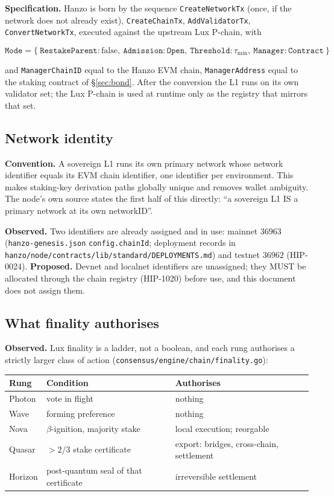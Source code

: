 \documentclass[11pt,a4paper]{article}
\theoremstyle{definition}
\theoremstyle{remark}
\newcommand{\code}[1]{\texttt{#1}}
\begin{document}
\textbf{Specification.} Hanzo is born by the sequence \code{CreateNetworkTx}
(once, if the network does not already exist), \code{CreateChainTx},
\code{AddValidatorTx}, \code{ConvertNetworkTx}, executed against the upstream
Lux P-chain, with

\[
\texttt{Mode} = \{\ \texttt{RestakeParent}: \text{false},\
\texttt{Admission}: \texttt{Open},\
\texttt{Threshold}: \tau_{\min},\
\texttt{Manager}: \texttt{Contract}\ \}
\]

and \code{ManagerChainID} equal to the Hanzo EVM chain, \code{ManagerAddress}
equal to the staking contract of \S\ref{sec:bond}. After the conversion the L1
runs on its own validator set; the Lux P-chain is used at runtime only as the
registry that mirrors that set.

\subsection{Network identity}

\textbf{Convention.} A sovereign L1 runs its own primary network whose network
identifier equals its EVM chain identifier, one identifier per environment. This
makes staking-key derivation paths globally unique and removes wallet ambiguity.
The node's own source states the first half of this directly: ``a sovereign L1
IS a primary network at its own networkID''.

\textbf{Observed.} Two identifiers are already assigned and in use: mainnet
$36963$ (\code{hanzo-genesis.json} \code{config.chainId}; deployment records in
\code{hanzo/node/contracts/lib/standard/DEPLOYMENTS.md}) and testnet $36962$
(HIP-0024). \textbf{Proposed.} Devnet and localnet identifiers are unassigned;
they MUST be allocated through the chain registry (HIP-1020) before use, and
this document does not assign them.

\subsection{What finality authorises}

\textbf{Observed.} Lux finality is a ladder, not a boolean, and each rung
authorises a strictly larger class of action
(\code{consensus/engine/chain/finality.go}):

\begin{center}
\begin{tabular}{@{}lll@{}}
\toprule
Rung & Condition & Authorises \\
\midrule
Photon  & vote in flight & nothing \\
Wave    & forming preference & nothing \\
Nova    & $\beta$-ignition, majority stake & local execution; reorgable \\
Quasar  & $>\!2/3$ stake certificate & export: bridges, cross-chain, settlement \\
Horizon & post-quantum seal of that certificate & irreversible settlement \\
\bottomrule
\end{tabular}
\end{center}
\end{document}
